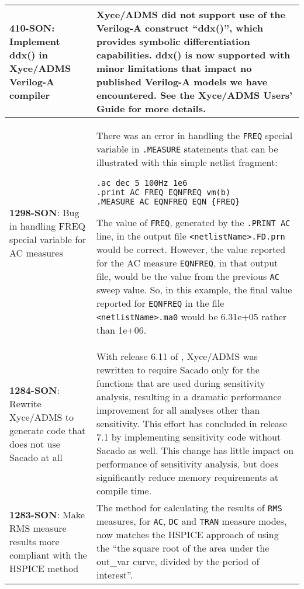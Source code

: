 {\begin{longtable}[h] {>{\raggedright\small}m{2in}|>{\raggedright\let\\\tabularnewline\small}m{3.5in}}
\textbf{410-SON}: Implement ddx() in Xyce/ADMS Verilog-A compiler &
Xyce/ADMS did not support use of the Verilog-A construct ``ddx()'',
which provides symbolic differentiation capabilities.  ddx() is now
supported with minor limitations that impact no published Verilog-A
models we have encountered.  See the Xyce/ADMS Users' Guide for more
details. \\ \hline

\textbf{1298-SON}: Bug in handling FREQ special variable for AC measures &
There was an error in handling the \texttt{FREQ} special variable in
\texttt{.MEASURE} statements that can be illustrated with this simple
netlist fragment:

\begin{verbatim}
.ac dec 5 100Hz 1e6
.print AC FREQ EQNFREQ vm(b)
.MEASURE AC EQNFREQ EQN {FREQ}
\end{verbatim}
The value of \texttt{FREQ}, generated by the \texttt{.PRINT AC} line,
in the output file \texttt{<netlistName>.FD.prn} would be correct.  However,
the value reported for the AC measure \texttt{EQNFREQ}, in that output file, would
be the value from the previous \texttt{AC} sweep value.  So, in this example,
the final value reported for \texttt{EQNFREQ} in the file \texttt{<netlistName>.ma0}
would be 6.31e+05 rather than 1e+06.
\\ \hline

\textbf{1284-SON}: Rewrite Xyce/ADMS to generate code that does not use Sacado  at all &
With release 6.11 of \Xyce{}, Xyce/ADMS was rewritten to require
Sacado only for the functions that are used during sensitivity
analysis, resulting in a dramatic performance improvement for all
analyses other than sensitivity.  This effort has concluded in release
7.1 by implementing sensitivity code without Sacado as well.  This
change has little impact on performance of sensitivity analysis, but
does significantly reduce memory requirements at compile
time. \\ \hline

\textbf{1283-SON}: Make RMS measure results more compliant with the HSPICE method &
The \Xyce{} method for calculating the results of \texttt{RMS} measures, for \texttt{AC},
\texttt{DC} and \texttt{TRAN} measure modes, now matches the HSPICE approach of using the
``the square root of the area under the out\_var curve, divided by the period of interest''.
\\ \hline


\end{longtable}}
